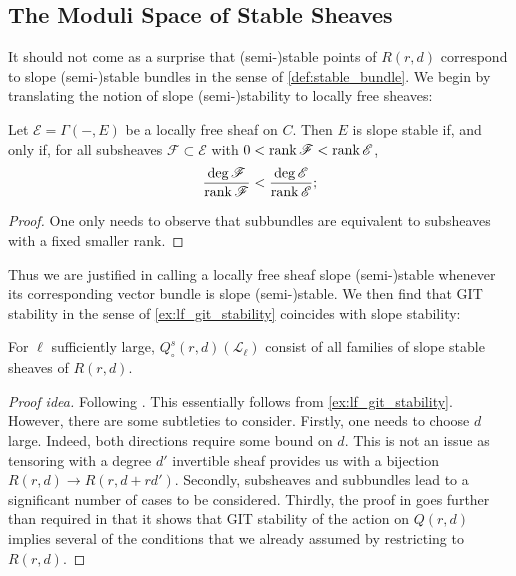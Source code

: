 \documentclass[12pt]{ociamthesis}  %
\begin{document}
\subsection{The Moduli Space of Stable Sheaves}

It should not come as a surprise that (semi-)stable points of
$R(r,d)$ correspond to slope (semi-)stable bundles
in the sense of \ref{def:stable_bundle}.
We begin by translating the notion of slope (semi-)stability to
locally free sheaves:

\begin{lemma}
  Let $\mathscr E=\Gamma(-,E)$ be a locally free sheaf on $C$.
  Then $E$ is slope stable if, and only if, for all subsheaves
  $\mathscr F\subset\mathscr E$ with $0<\operatorname{rank}\mathscr F<\operatorname{rank}\mathscr E$,
  \begin{align}\label{eq:sheaf_slope_stability}
    \frac{\deg\mathscr F}{\operatorname{rank}\mathscr F}<\frac{\deg\mathscr E}{\operatorname{rank}\mathscr E};
  \end{align}
  \begin{proof}
    One only needs to observe that subbundles are equivalent to
    subsheaves with a fixed smaller rank.
  \end{proof}
\end{lemma}

Thus we are justified in calling a locally free sheaf slope (semi-)stable
whenever its corresponding vector bundle is slope (semi-)stable. We
then find that GIT stability in the sense of \ref{ex:lf_git_stability}
coincides with slope stability:

\begin{example}\label{thm:stability_of_lf_sheaves}
  For $\ell$ sufficiently large, $Q^s_\circ(r,d)(\mathscr L_\ell)$
  consist of all families of  slope stable sheaves of $R(r,d)$.
  \begin{proof}[Proof idea]
    Following \cite[79-82]{hoskins2016}. This essentially follows
    from \ref{ex:lf_git_stability}. However, there are some subtleties
    to consider. Firstly, one needs to choose $d$ large. Indeed,
    both directions require some bound on $d$. This is
    not an issue as tensoring with a degree $d'$ invertible sheaf
    provides us with a bijection $R(r,d)\to R(r,d+rd')$.
    Secondly, subsheaves and subbundles lead to a significant number
    of cases to be considered. Thirdly, the proof in \cite{hoskins2016}
    goes further than required in that it shows that GIT stability
    of the action on $Q(r,d)$ implies several of the conditions that
    we already assumed by restricting to $R(r,d)$.
  \end{proof}
\end{example}
\end{document}
